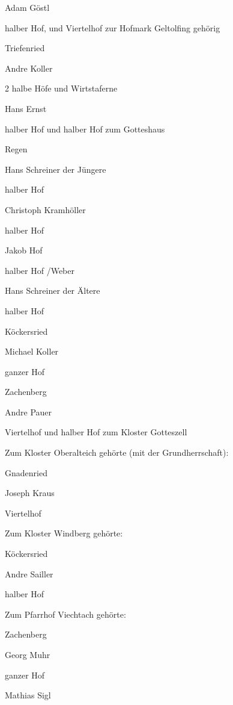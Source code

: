 Adam Göstl

halber Hof, und Viertelhof zur Hofmark Geltolfing gehörig

Triefenried

Andre Koller

2 halbe Höfe und Wirtstaferne



Hans Ernst

halber Hof und halber Hof zum Gotteshaus

Regen



Hans Schreiner der Jüngere

halber Hof



Christoph Kramhöller

halber Hof



Jakob Hof

halber Hof /Weber



Hans Schreiner der Ältere

halber Hof

Köckersried

Michael Koller

ganzer Hof

Zachenberg

Andre Pauer

Viertelhof und halber Hof zum Kloster Gotteszell



Zum Kloster Oberalteich gehörte (mit der Grundherrschaft):



Gnadenried

Joseph Kraus

Viertelhof



Zum Kloster Windberg gehörte:



Köckersried

Andre Sailler

halber Hof



Zum Pfarrhof Viechtach gehörte:



Zachenberg

Georg Muhr

ganzer Hof



Mathias Sigl


